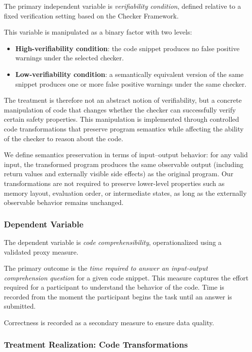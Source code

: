 The primary independent variable is \textit{verifiability condition}, defined relative to a fixed verification setting based on the Checker Framework.

This variable is manipulated as a binary factor with two levels:
\begin{itemize}
    \item \textbf{High-verifiability condition}: the code snippet produces no false positive warnings under the selected checker.
    \item \textbf{Low-verifiability condition}: a semantically equivalent version of the same snippet produces one or more false positive warnings under the same checker.
\end{itemize}

The treatment is therefore not an abstract notion of verifiability, but a concrete manipulation of code that changes whether the checker can successfully verify certain safety properties. This manipulation is implemented through controlled code transformations that preserve program semantics while affecting the ability of the checker to reason about the code. 

We define semantics preservation in terms of input--output behavior: for any valid input, the transformed program produces the same observable output (including return values and externally visible side effects) as the original program. Our transformations are not required to preserve lower-level properties such as memory layout, evaluation order, or intermediate states, as long as the externally observable behavior remains unchanged.

\subsubsection{Dependent Variable}

The dependent variable is \textit{code comprehensibility}, operationalized using a validated proxy measure.

The primary outcome is the \textit{time required to answer an input-output comprehension question} for a given code snippet. This measure captures the effort required for a participant to understand the behavior of the code. Time is recorded from the moment the participant begins the task until an answer is submitted.

Correctness is recorded as a secondary measure to ensure data quality.

\subsubsection{Treatment Realization: Code Transformations}

